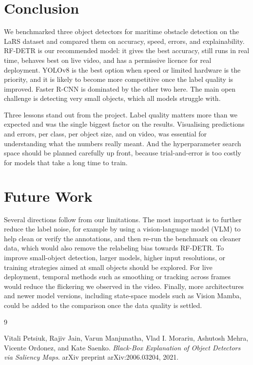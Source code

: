 \documentclass[11pt,a4paper]{article}
\begin{document}
\section{Conclusion}
We benchmarked three object detectors for maritime obstacle detection on the LaRS
dataset and compared them on accuracy, speed, errors, and explainability. RF-DETR
is our recommended model: it gives the best accuracy, still runs in real time,
behaves best on live video, and has a permissive licence for real deployment.
YOLOv8 is the best option when speed or limited hardware is the priority, and it is
likely to become more competitive once the label quality is improved. Faster R-CNN
is dominated by the other two here. The main open challenge is detecting very
small objects, which all models struggle with.

Three lessons stand out from the project. Label quality matters more than we
expected and was the single biggest factor on the results. Visualising predictions
and errors, per class, per object size, and on video, was essential for
understanding what the numbers really meant. And the hyperparameter search space
should be planned carefully up front, because trial-and-error is too costly for
models that take a long time to train.

\section{Future Work}
Several directions follow from our limitations. The most important is to further
reduce the label noise, for example by using a vision-language model (VLM) to
help clean or verify the annotations, and then re-run the benchmark on cleaner
data, which would also remove the relabeling bias towards RF-DETR. To improve
small-object detection, larger models, higher input resolutions, or training
strategies aimed at small objects should be explored. For live deployment,
temporal methods such as smoothing or tracking across frames would reduce the
flickering we observed in the video. Finally, more architectures and newer model
versions, including state-space models such as Vision Mamba, could be added to
the comparison once the data quality is settled.

\clearpage




\begingroup
\renewcommand{\section}[2]{}
\begin{thebibliography}{9}
\setcounter{enumiv}{8}

Vitali Petsiuk, Rajiv Jain, Varun Manjunatha, Vlad I. Morariu,
Ashutosh Mehra, Vicente Ordonez, and Kate Saenko.
\textit{Black-Box Explanation of Object Detectors via Saliency Maps}.
arXiv preprint arXiv:2006.03204, 2021.



\end{thebibliography}
\endgroup
\end{document}
